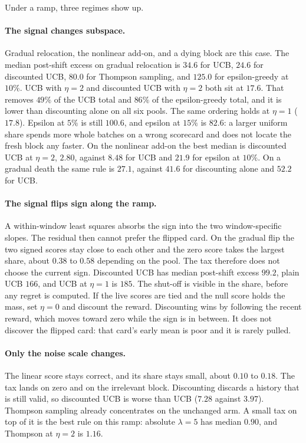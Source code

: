 \documentclass[11pt]{article}
\begin{document}
Under a ramp, three regimes show up.

\paragraph{The signal changes subspace.}
Gradual relocation, the nonlinear add-on, and a dying block are this case.
The median post-shift excess on gradual relocation is \(34.6\) for UCB, \(24.6\) for discounted UCB, \(80.0\) for Thompson sampling, and \(125.0\) for epsilon-greedy at \(10\%\).
UCB with \(\eta=2\) and discounted UCB with \(\eta=2\) both sit at \(17.6\).
That removes \(49\%\) of the UCB total and \(86\%\) of the epsilon-greedy total, and it is lower than discounting alone on all six pools.
The same ordering holds at \(\eta=1\) (\(17.8\)).
Epsilon at \(5\%\) is still \(100.6\), and epsilon at \(15\%\) is \(82.6\): a larger uniform share spends more whole batches on a wrong scorecard and does not locate the fresh block any faster.
On the nonlinear add-on the best median is discounted UCB at \(\eta=2\), \(2.80\), against \(8.48\) for UCB and \(21.9\) for epsilon at \(10\%\).
On a gradual death the same rule is \(27.1\), against \(41.6\) for discounting alone and \(52.2\) for UCB.

\paragraph{The signal flips sign along the ramp.}
A within-window least squares absorbs the sign into the two window-specific slopes.
The residual then cannot prefer the flipped card.
On the gradual flip the two signed scores stay close to each other and the zero score takes the largest share, about \(0.38\) to \(0.58\) depending on the pool.
The tax therefore does not choose the current sign.
Discounted UCB has median post-shift excess \(99.2\), plain UCB \(166\), and UCB at \(\eta=1\) is \(185\).
The shut-off is visible in the share, before any regret is computed.
If the live scores are tied and the null score holds the mass, set \(\eta=0\) and discount the reward.
Discounting wins by following the recent reward, which moves toward zero while the sign is in between.
It does not discover the flipped card: that card's early mean is poor and it is rarely pulled.

\paragraph{Only the noise scale changes.}
The linear score stays correct, and its share stays small, about \(0.10\) to \(0.18\).
The tax lands on zero and on the irrelevant block.
Discounting discards a history that is still valid, so discounted UCB is worse than UCB (\(7.28\) against \(3.97\)).
Thompson sampling already concentrates on the unchanged arm.
A small tax on top of it is the best rule on this ramp: absolute \(\lambda=5\) has median \(0.90\), and Thompson at \(\eta=2\) is \(1.16\).
\end{document}
